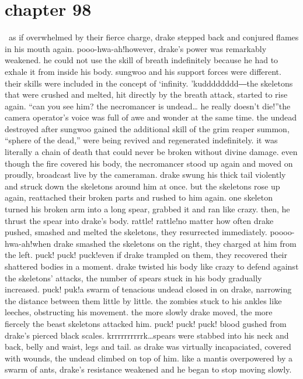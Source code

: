 \section{chapter 98}






 as if overwhelmed by their fierce charge, drake stepped back and conjured flames in his mouth again.
pooo-hwa-ah!however, drake’s power was remarkably weakened.
 he could not use the skill of breath indefinitely because he had to exhale it from inside his body.
sungwoo and his support forces were different.
 their skills were included in the concept of ‘infinity.
’kudddddddd―the skeletons that were crushed and melted, hit directly by the breath attack, started to rise again.
“can you see him? the necromancer is undead… he really doesn’t die!”the camera operator’s voice was full of awe and wonder at the same time.
the undead destroyed after sungwoo gained the additional skill of the grim reaper summon, “sphere of the dead,” were being revived and regenerated indefinitely.
 it was literally a chain of death that could never be broken without divine damage.
even though the fire covered his body, the necromancer stood up again and moved on proudly, broadcast live by the cameraman.
drake swung his thick tail violently and struck down the skeletons around him at once.
but the skeletons rose up again, reattached their broken parts and rushed to him again.
one skeleton turned his broken arm into a long spear, grabbed it and ran like crazy.
then, he thrust the spear into drake’s body.
rattle! rattle!no matter how often drake pushed, smashed and melted the skeletons, they resurrected immediately.
poooo-hwa-ah!when drake smashed the skeletons on the right, they charged at him from the left.
puck! puck! puck!even if drake trampled on them, they recovered their shattered bodies in a moment.
 drake twisted his body like crazy to defend against the skeletons’ attacks, the number of spears stuck in his body gradually increased.
puck! puk!a swarm of tenacious undead closed in on drake, narrowing the distance between them little by little.
the zombies stuck to his ankles like leeches, obstructing his movement.
 the more slowly drake moved, the more fiercely the beast skeletons attacked him.
puck! puck! puck!
blood gushed from drake’s pierced black scales.
krrrrrrrrrrk…spears were stabbed into his neck and back, belly and waist, legs and tail.
 as drake was virtually incapaciated, covered with wounds, the undead climbed on top of him.
like a mantis overpowered by a swarm of ants, drake’s resistance weakened and he began to stop moving slowly.
